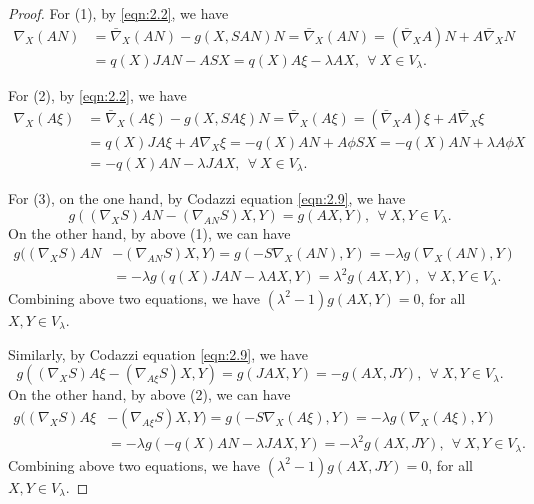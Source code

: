\documentclass[reqno]{amsart}%
\theoremstyle{definition}
\numberwithin{equation}{section}
\begin{document}
\begin{proof}
For (1), by \eqref{eqn:2.2}, we have
$$
\begin{aligned}
\nabla_X (AN)&=\bar{\nabla}_X (AN)-g(X,SAN)N=\bar{\nabla}_X (AN)=(\bar{\nabla}_X A)N+A\bar{\nabla}_X N\\
&=q(X)JAN-ASX=q(X)A\xi-\lambda AX, \ \ \forall\ X\in V_\lambda.
\end{aligned}
$$

For (2), by \eqref{eqn:2.2}, we have
$$
\begin{aligned}
\nabla_X (A\xi)&=\bar{\nabla}_X (A\xi)-g(X,SA\xi)N=\bar{\nabla}_X (A\xi)=(\bar{\nabla}_X A)\xi+A\bar{\nabla}_X \xi\\
&=q(X)JA\xi+A\nabla_X \xi=-q(X)AN+A\phi SX=-q(X)AN+\lambda A\phi X\\
&=-q(X)AN-\lambda JAX, \ \ \forall\ X\in V_\lambda.
\end{aligned}
$$


For (3), on the one hand, by Codazzi equation \eqref{eqn:2.9}, we have
$$
g((\nabla_X S)AN-(\nabla_{AN} S)X,Y)=g(AX,Y), \ \ \forall\ X,Y\in V_\lambda.
$$
On the other hand, by above (1), we can have
$$
\begin{aligned}
g((\nabla_X S)AN&-(\nabla_{AN} S)X,Y)=g(-S\nabla_X (AN),Y)=-\lambda g(\nabla_X (AN),Y)\\
&=-\lambda g(q(X)JAN-\lambda AX,Y)=\lambda^2 g(AX,Y), \ \ \forall\ X,Y\in V_\lambda.
\end{aligned}
$$
Combining above two equations, we have $(\lambda^2-1)g(AX,Y)=0$, for all $X,Y\in V_\lambda$.

Similarly, by Codazzi equation \eqref{eqn:2.9}, we have
$$
g((\nabla_X S)A\xi-(\nabla_{A\xi} S)X,Y)=g(JAX,Y)=-g(AX,JY), \ \ \forall\ X,Y\in V_\lambda.
$$
On the other hand, by above (2), we can have
$$
\begin{aligned}
g((\nabla_X S)A\xi&-(\nabla_{A\xi} S)X,Y)=g(-S\nabla_X (A\xi),Y)=-\lambda g(\nabla_X (A\xi),Y)\\
&=-\lambda g(-q(X)AN-\lambda JAX,Y)=-\lambda^2 g(AX,JY), \ \ \forall\ X,Y\in V_\lambda.
\end{aligned}
$$
Combining above two equations, we have $(\lambda^2-1)g(AX,JY)=0$, for all $X,Y\in V_\lambda$.
\end{proof}
\end{document}
